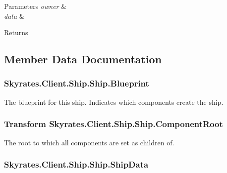 \begin{DoxyParams}{Parameters}
{\em owner} & \\
\hline
{\em data} & \\
\hline
\end{DoxyParams}
\begin{DoxyReturn}{Returns}

\end{DoxyReturn}


\subsection{Member Data Documentation}
\hypertarget{class_skyrates_1_1_client_1_1_ship_1_1_ship_a698461079579d1847c9d8a4fb4688da0}{
\subsubsection[{Blueprint}]{ Skyrates.\-Client.\-Ship.\-Ship.\-Blueprint}}\label{class_skyrates_1_1_client_1_1_ship_1_1_ship_a698461079579d1847c9d8a4fb4688da0}


The blueprint for this ship. Indicates which components create the ship. 

\hypertarget{class_skyrates_1_1_client_1_1_ship_1_1_ship_a2c9f15ba4d40bfae0e0dd3c7958d4f22}{
\subsubsection[{Component\-Root}]{\setlength{\rightskip}{0pt plus 5cm}Transform Skyrates.\-Client.\-Ship.\-Ship.\-Component\-Root}}\label{class_skyrates_1_1_client_1_1_ship_1_1_ship_a2c9f15ba4d40bfae0e0dd3c7958d4f22}


The root to which all components are set as children of. 

\hypertarget{class_skyrates_1_1_client_1_1_ship_1_1_ship_a34acbbe72da92209ca8a2239b5819553}{
\subsubsection[{Ship\-Data}]{ Skyrates.\-Client.\-Ship.\-Ship.\-Ship\-Data}}\label{class_skyrates_1_1_client_1_1_ship_1_1_ship_a34acbbe72da92209ca8a2239b5819553}


